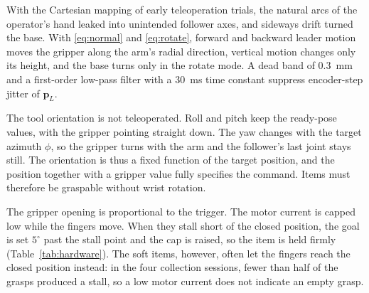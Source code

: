 With the Cartesian mapping of early teleoperation trials, the natural arcs
of the operator's hand leaked into unintended follower axes, and sideways
drift turned the base. With \eqref{eq:normal} and
\eqref{eq:rotate}, forward and backward leader motion moves the gripper along
the arm's radial direction, vertical motion changes only its height, and the
base turns only in the rotate mode. A dead band
of 0.3~mm and a first-order low-pass filter with a 30~ms time constant
suppress encoder-step jitter of $\mathbf{p}_L$.

The tool orientation is not teleoperated. Roll and pitch keep the ready-pose
values, with the gripper pointing straight down. The yaw changes with the
target azimuth $\phi$, so the gripper turns with the arm and the follower's
last joint stays still. The orientation is thus a fixed function of the target
position, and the position together with a gripper value fully specifies the
command. Items must therefore be graspable without wrist rotation.

The gripper opening is proportional to the trigger. The motor current is
capped low while the fingers move. When they stall short of the closed
position, the goal is set $5^\circ$ past the stall point and the cap is
raised, so the item is held firmly (Table~\ref{tab:hardware}). The soft items, however, often let the
fingers reach the closed position instead: in the four collection sessions,
fewer than half of the grasps produced a stall, so a low motor current does
not indicate an empty grasp.

